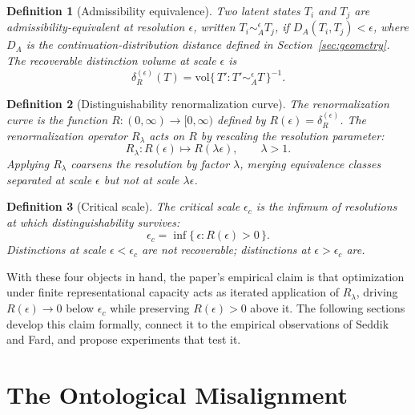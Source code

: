 \documentclass[11pt]{article}
\newtheorem{definition}{Definition}
\begin{document}
\begin{definition}[Admissibility equivalence]
Two latent states $T_i$ and $T_j$ are admissibility-equivalent at resolution $\epsilon$, written
$T_i \sim_A^\epsilon T_j$, if $D_A(T_i, T_j) < \epsilon$, where $D_A$ is the
continuation-distribution distance defined in Section~\ref{sec:geometry}. The recoverable
distinction volume at scale $\epsilon$ is
\begin{equation}
\delta_R^{(\epsilon)}(T) = \mathrm{vol}\bigl\{\, T' : T' \sim_A^\epsilon T \,\bigr\}^{-1}.
\end{equation}
\end{definition}

\begin{definition}[Distinguishability renormalization curve]
The renormalization curve is the function $R: (0,\infty) \to [0,\infty)$ defined by
$R(\epsilon) = \delta_R^{(\epsilon)}$. The renormalization operator $R_\lambda$ acts on $R$ by
rescaling the resolution parameter:
\begin{equation}
R_\lambda: R(\epsilon) \mapsto R(\lambda\epsilon), \qquad \lambda > 1.
\end{equation}
Applying $R_\lambda$ coarsens the resolution by factor $\lambda$, merging equivalence classes
separated at scale $\epsilon$ but not at scale $\lambda\epsilon$.
\end{definition}

\begin{definition}[Critical scale]
The critical scale $\epsilon_c$ is the infimum of resolutions at which distinguishability
survives:
\begin{equation}
\epsilon_c = \inf\bigl\{\, \epsilon : R(\epsilon) > 0 \,\bigr\}.
\end{equation}
Distinctions at scale $\epsilon < \epsilon_c$ are not recoverable; distinctions at
$\epsilon > \epsilon_c$ are.
\end{definition}

With these four objects in hand, the paper's empirical claim is that optimization under finite
representational capacity acts as iterated application of $R_\lambda$, driving $R(\epsilon) \to 0$
below $\epsilon_c$ while preserving $R(\epsilon) > 0$ above it. The following sections develop
this claim formally, connect it to the empirical observations of Seddik and Fard, and propose
experiments that test it.

\section{The Ontological Misalignment}
\end{document}
